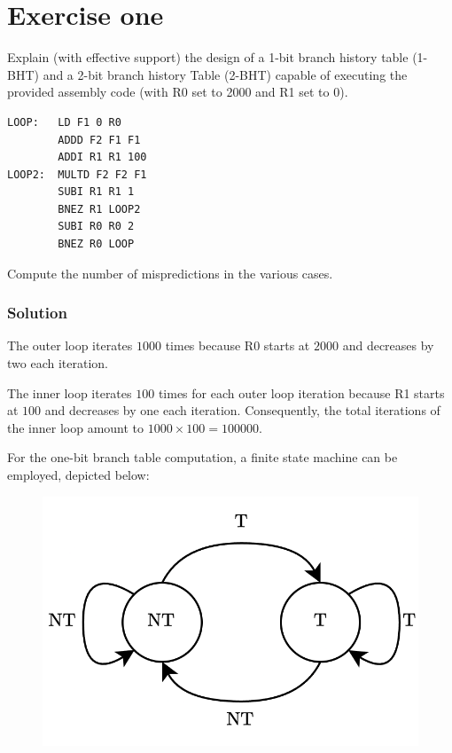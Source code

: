 \section{Exercise one}

Explain (with effective support) the design of a 1-bit branch history table (1-BHT) and a 2-bit branch history Table (2-BHT) capable of executing the provided assembly code (with R0 set to 2000 and R1 set to 0).
\begin{verbatim}
LOOP:   LD F1 0 R0
        ADDD F2 F1 F1
        ADDI R1 R1 100
LOOP2:  MULTD F2 F2 F1
        SUBI R1 R1 1
        BNEZ R1 LOOP2
        SUBI R0 R0 2
        BNEZ R0 LOOP
\end{verbatim}
Compute the number of mispredictions in the various cases. 

\subsubsection*{Solution}
The outer loop iterates $1000$ times because R0 starts at $2000$ and decreases by two each iteration.

The inner loop iterates $100$ times for each outer loop iteration because R1 starts at $100$ and decreases by one each iteration. 
Consequently, the total iterations of the inner loop amount to $1000 \times 100 = 100000$.

For the one-bit branch table computation, a finite state machine can be employed, depicted below:
\begin{figure}[H]
    \centering
    \includegraphics[width=0.4\linewidth]{images/1bht.png}
\end{figure}

